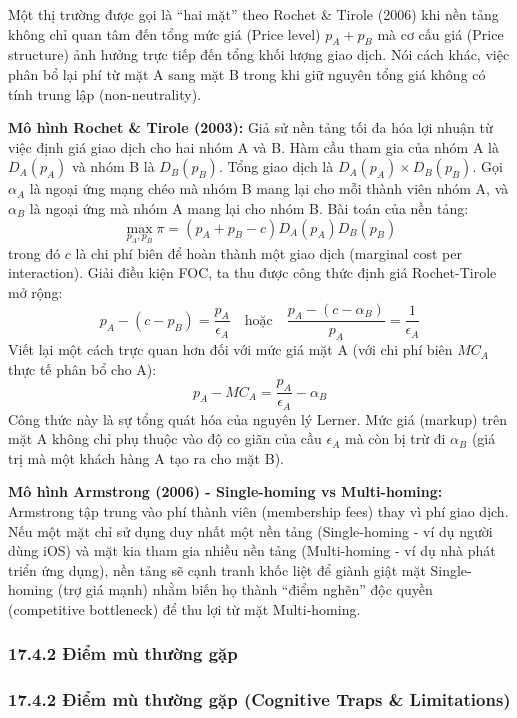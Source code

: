 \documentclass[
]{article}
\begin{document}
Một thị trường được gọi là ``hai mặt'' theo Rochet \& Tirole (2006) khi
nền tảng không chỉ quan tâm đến tổng mức giá (Price level) \(p_A + p_B\)
mà cơ cấu giá (Price structure) ảnh hưởng trực tiếp đến tổng khối lượng
giao dịch. Nói cách khác, việc phân bổ lại phí từ mặt A sang mặt B trong
khi giữ nguyên tổng giá không có tính trung lập (non-neutrality).

\textbf{Mô hình Rochet \& Tirole (2003):} Giả sử nền tảng tối đa hóa lợi
nhuận từ việc định giá giao dịch cho hai nhóm A và B. Hàm cầu tham gia
của nhóm A là \(D_A(p_A)\) và nhóm B là \(D_B(p_B)\). Tổng giao dịch là
\(D_A(p_A) \times D_B(p_B)\). Gọi \(\alpha_A\) là ngoại ứng mạng chéo mà
nhóm B mang lại cho mỗi thành viên nhóm A, và \(\alpha_B\) là ngoại ứng
mà nhóm A mang lại cho nhóm B. Bài toán của nền tảng:
\[ \max_{p_A, p_B} \pi = (p_A + p_B - c) D_A(p_A) D_B(p_B) \] trong đó
\(c\) là chi phí biên để hoàn thành một giao dịch (marginal cost per
interaction). Giải điều kiện FOC, ta thu được công thức định giá
Rochet-Tirole mở rộng:
\[ p_A - (c - p_B) = \frac{p_A}{\epsilon_A} \quad \text{hoặc} \quad \frac{p_A - (c - \alpha_B)}{p_A} = \frac{1}{\epsilon_A} \]
Viết lại một cách trực quan hơn đối với mức giá mặt A (với chi phí biên
\(MC_A\) thực tế phân bổ cho A):
\[ p_A - MC_A = \frac{p_A}{\epsilon_A} - \alpha_B \] Công thức này là sự
tổng quát hóa của nguyên lý Lerner. Mức giá (markup) trên mặt A không
chỉ phụ thuộc vào độ co giãn của cầu \(\epsilon_A\) mà còn bị trừ đi
\(\alpha_B\) (giá trị mà một khách hàng A tạo ra cho mặt B).

\textbf{Mô hình Armstrong (2006) - Single-homing vs Multi-homing:}
Armstrong tập trung vào phí thành viên (membership fees) thay vì phí
giao dịch. Nếu một mặt chỉ sử dụng duy nhất một nền tảng (Single-homing
- ví dụ người dùng iOS) và mặt kia tham gia nhiều nền tảng (Multi-homing
- ví dụ nhà phát triển ứng dụng), nền tảng sẽ cạnh tranh khốc liệt để
giành giật mặt Single-homing (trợ giá mạnh) nhằm biến họ thành ``điểm
nghẽn'' độc quyền (competitive bottleneck) để thu lợi từ mặt
Multi-homing.

\subsubsection{17.4.2 Điểm mù thường
gặp}\label{ux111iux1ec3m-muxf9-thux1b0ux1eddng-gux1eb7p-16}

\subsubsection{17.4.2 Điểm mù thường gặp (Cognitive Traps \&
Limitations)}\label{ux111iux1ec3m-muxf9-thux1b0ux1eddng-gux1eb7p-cognitive-traps-limitations-123}
\end{document}
